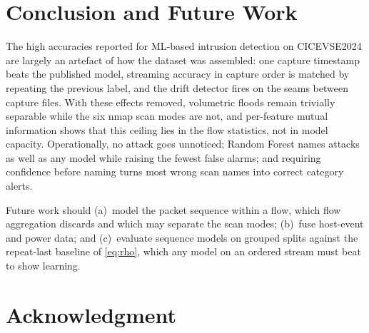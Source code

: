\documentclass[conference]{IEEEtran}
\begin{document}
\section{Conclusion and Future Work}
\label{sec:conclusion}

The high accuracies reported for ML-based intrusion detection on CICEVSE2024 are largely an artefact of how the dataset was assembled: one capture timestamp beats the published model, streaming accuracy in capture order is matched by repeating the previous label, and the drift detector fires on the seams between capture files. With these effects removed, volumetric floods remain trivially separable while the six nmap scan modes are not, and per-feature mutual information shows that this ceiling lies in the flow statistics, not in model capacity. Operationally, no attack goes unnoticed; Random Forest names attacks as well as any model while raising the fewest false alarms; and requiring confidence before naming turns most wrong scan names into correct category alerts.

Future work should (a)~model the packet sequence within a flow, which flow aggregation discards and which may separate the scan modes; (b)~fuse host-event and power data; and (c)~evaluate sequence models on grouped splits against the repeat-last baseline of \eqref{eq:rho}, which any model on an ordered stream must beat to show learning.

\section*{Acknowledgment}
\end{document}
